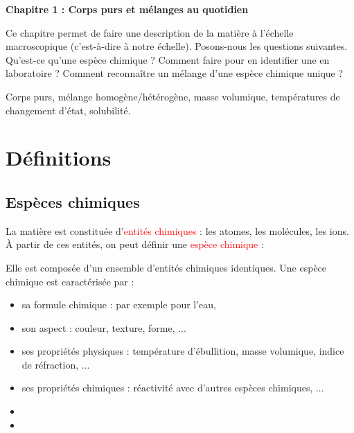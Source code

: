 \newpage

\renewcommand{\thesubsection}{\textcolor{red}{\Roman{section}.\arabic{subsection}}}
\renewcommand{\thesubsubsection}{\textcolor{red}{\Roman{section}.\arabic{subsection}.\alph{subsubsection}}}

\setcounter{section}{0}
\sndEnTeteUn

\begin{center}
\begin{mdframed}[style=titr, leftmargin=60pt, rightmargin=60pt, innertopmargin=7pt, innerbottommargin=7pt, innerrightmargin=8pt, innerleftmargin=8pt]

\begin{center}
\large{\textbf{Chapitre 1 : Corps purs et mélanges au quotidien}}
\end{center}

\end{mdframed}
\end{center}
Ce chapitre permet de faire une description de la matière à l'échelle macroscopique (c'est-à-dire à notre échelle). Posons-nous les questions suivantes. Qu'est-ce qu'une espèce chimique ? Comment faire pour en identifier une en laboratoire ? Comment reconnaître un mélange d'une espèce chimique unique ?
%
\begin{tcolorbox}[colback=blue!5!white,colframe=blue!75!black,title=Mots clés du chapitre :]
Corps purs, mélange homogène/hétérogène, masse volumique, températures de changement d'état, solubilité.
\end{tcolorbox}

%

\section{Définitions}

\subsection{Espèces chimiques}

La matière est constituée d'\textcolor{red}{entités chimiques} : les atomes, les molécules, les ions. \`{A} partir de ces entités, on peut définir une \textcolor{red}{espèce chimique} :
\begin{tcolorbox}[colback=green!5!white,colframe=green!75!black,title=\textbf{Espèce chimique}, upperbox=invisible]
Elle est composée d'un ensemble d'entités chimiques identiques. Une espèce chimique est caractérisée par :
\begin{itemize}
    \item sa formule chimique : par exemple  pour l'eau,
    \item son aspect : couleur, texture, forme, ...
    \item ses propriétés physiques : température d'ébullition, masse volumique, indice de réfraction, ...
    \item ses propriétés chimiques : réactivité avec d'autres espèces chimiques, ... 
    \item 
    \item
\end{itemize}

\end{tcolorbox}

